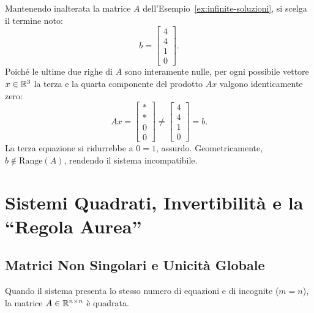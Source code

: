 \begin{example}
\label{ex:sistema-impossibile}
Mantenendo inalterata la matrice $A$ dell'Esempio~\ref{ex:infinite-soluzioni}, si scelga il termine noto:
\begin{equation}
    b = \begin{bmatrix} 4 \\ 4 \\ 1 \\ 0 \end{bmatrix}.
\end{equation}
Poich\'e le ultime due righe di $A$ sono interamente nulle, per ogni possibile vettore $x \in \mathbb{R}^3$ la terza e la quarta componente del prodotto $Ax$ valgono identicamente zero:
\begin{equation}
    Ax = \begin{bmatrix} * \\ * \\ 0 \\ 0 \end{bmatrix} \neq \begin{bmatrix} 4 \\ 4 \\ 1 \\ 0 \end{bmatrix} = b.
\end{equation}
La terza equazione si ridurrebbe a $0 = 1$, assurdo. Geometricamente, $b \notin \mathrm{Range}(A)$, rendendo il sistema incompatibile.
\end{example}

\FloatBarrier
\section{Sistemi Quadrati, Invertibilit\`a e la ``Regola Aurea''}
\label{sec:matrici-invertibili-regola-aurea}

\subsection{Matrici Non Singolari e Unicit\`a Globale}
Quando il sistema presenta lo stesso numero di equazioni e di incognite ($m = n$), la matrice $A \in \mathbb{R}^{n \times n}$ \`e quadrata.

